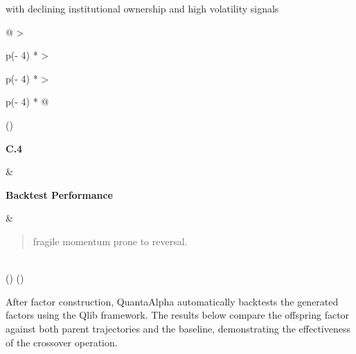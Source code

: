\documentclass[
]{article}
\begin{document}
with declining institutional ownership and high volatility signals

\begin{longtable}[]{@{}
  >{\raggedright\arraybackslash}p{(\columnwidth - 4\tabcolsep) * }
  >{\raggedright\arraybackslash}p{(\columnwidth - 4\tabcolsep) * }
  >{\raggedright\arraybackslash}p{(\columnwidth - 4\tabcolsep) * }@{}}
\toprule()
\begin{minipage}[b]{\linewidth}\raggedright
\textbf{C.4}
\end{minipage} & \begin{minipage}[b]{\linewidth}\raggedright
\textbf{Backtest Performance}
\end{minipage} & \begin{minipage}[b]{\linewidth}\raggedright
\begin{quote}
fragile momentum prone to reversal.
\end{quote}
\end{minipage} \\
\midrule()
\endhead
\bottomrule()
\end{longtable}

After factor construction, QuantaAlpha automatically backtests the
generated factors using the Qlib framework. The results below compare
the offspring factor against both parent trajectories and the baseline,
demonstrating the effectiveness of the crossover operation.
\end{document}
